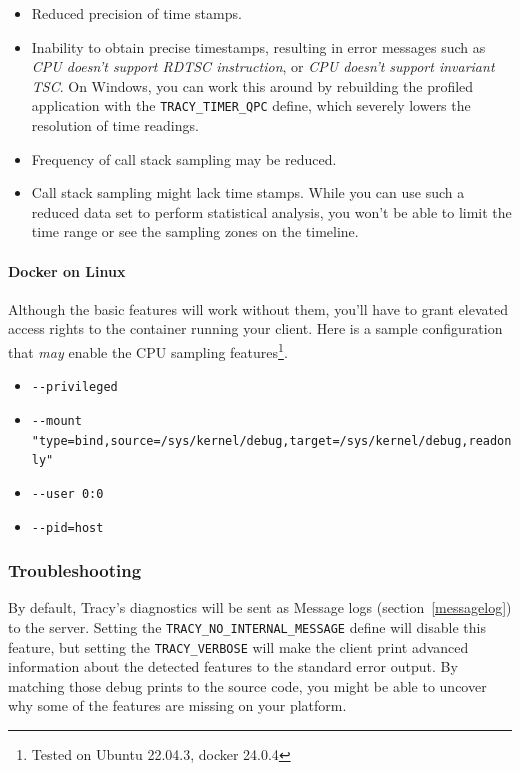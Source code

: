 \documentclass[hidelinks,titlepage,a4paper,twoside]{article}
\begin{document}
\begin{itemize}
\item Reduced precision of time stamps.
\item Inability to obtain precise timestamps, resulting in error messages such as \emph{CPU doesn't support RDTSC instruction}, or \emph{CPU doesn't support invariant TSC}. On Windows, you can work this around by rebuilding the profiled application with the \texttt{TRACY\_TIMER\_QPC} define, which severely lowers the resolution of time readings.
\item Frequency of call stack sampling may be reduced.
\item Call stack sampling might lack time stamps. While you can use such a reduced data set to perform statistical analysis, you won't be able to limit the time range or see the sampling zones on the timeline.
\end{itemize}

\paragraph{Docker on Linux}

Although the basic features will work without them, you'll have to grant elevated access rights to the container running your client. Here is a sample configuration that \textit{may} enable the CPU sampling features\footnote{Tested on Ubuntu 22.04.3, docker 24.0.4}.
\begin{itemize}
    \item \texttt{-{}-privileged}
    \item \texttt{-{}-mount "type=bind,source=/sys/kernel/debug,target=/sys/kernel/debug,readonly"}
    \item \texttt{-{}-user 0:0}
    \item \texttt{-{}-pid=host}
\end{itemize}

\subsubsection{Troubleshooting}

By default, Tracy's diagnostics will be sent as Message logs (section~\ref{messagelog}) to the server.
Setting the \texttt{TRACY\_NO\_INTERNAL\_MESSAGE} define will disable this feature, but setting the \texttt{TRACY\_VERBOSE} will make the client print advanced information about the detected features to the standard error output. By matching those debug prints to the source code, you might be able to uncover why some of the features are missing on your platform.
\end{document}
